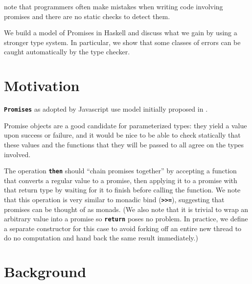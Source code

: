 \documentclass[12pt, english, letterpaper]{kuthesis}
\newcommand{\lit}[1]{\textbf{\texttt{#1}}}
\begin{document}
\cite{madsen} note that programmers often make mistakes when writing code involving promises and there are no static checks to detect them.

We build a model of \textsf{Promises} in Haskell and discuss what we gain by using a stronger type system.  In particular, we show that some classes of errors can be caught automatically by the type checker.
\chapter*{Motivation}
\lit{Promises} as adopted by Javascript use model initially proposed in \cite{friedman}.

Promise objects are a good candidate for parameterized types: they yield a value upon success or failure, and it would be nice to be able to check statically that these values and the functions that they will be passed to all agree on the types involved.

The operation \lit{then} should ``chain promises together'' by accepting a function that converts a regular value to a promise, then applying it to a promise with that return type by waiting for it to finish before calling the function.  We note that this operation is very similar to monadic bind (\lit{>>=}), suggesting that promises can be thought of as monads.  (We also note that it is trivial to wrap an arbitrary value into a promise so \lit{return} poses no problem.  In practice, we define a separate constructor for this case to avoid forking off an entire new thread to do no computation and hand back the same result immediately.)

\chapter*{Background}
\end{document}
